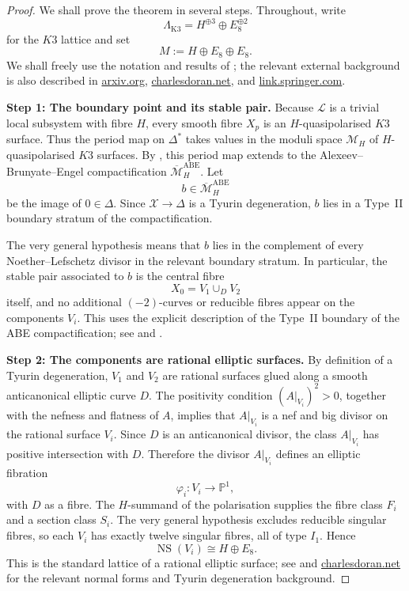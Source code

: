 \documentclass[11pt]{amsart}
\theoremstyle{plain}
\theoremstyle{remark}
\newcommand{\NS}{\operatorname{NS}}
\newcommand{\Kthree}{\mathrm{K3}}
\newcommand{\cL}{\mathcal{L}}
\newcommand{\cX}{\mathcal{X}}
\newcommand{\cM}{\mathcal{M}}
\newcommand{\bbP}{\mathbb{P}}
\newcommand{\Lk}{\Lambda_{\Kthree}}
\begin{document}
\begin{proof}
We shall prove the theorem in several steps. Throughout, write
\[
\Lk=H^{\oplus 3}\oplus E_8^{\oplus 2}
\]
for the \(K3\) lattice and set
\[
M:=H\oplus E_8\oplus E_8.
\]
We shall freely use the notation and results of \cite{dfk3slpms}; the relevant
external background is also described in
\href{https://arxiv.org/html/2405.12009}{arxiv.org},
\href{https://www.charlesdoran.net/uploads/6/7/5/1/6751141/2311.10394.pdf}{charlesdoran.net},
and
\href{https://link.springer.com/article/10.1007/s00209-019-02279-9}{link.springer.com}.

\medskip
\noindent
\textbf{Step 1: The boundary point and its stable pair.}
Because \(\cL\) is a trivial local subsystem with fibre \(H\), every smooth fibre
\(X_p\) is an \(H\)-quasipolarised \(K3\) surface. Thus the period map on
\(\Delta^*\) takes values in the moduli space \(\cM_H\) of \(H\)-quasipolarised
\(K3\) surfaces. By \cite[Theorem~1.1]{cmek3sspt}, this period map extends to the
Alexeev--Brunyate--Engel compactification \(\overline{\cM}_H^{\mathrm{ABE}}\).
Let
\[
b\in \overline{\cM}_H^{\mathrm{ABE}}
\]
be the image of \(0\in\Delta\). Since \(\cX\to\Delta\) is a Tyurin degeneration,
\(b\) lies in a Type~II boundary stratum of the compactification.

The very general hypothesis means that \(b\) lies in the complement of every
Noether--Lefschetz divisor in the relevant boundary stratum. In particular, the
stable pair associated to \(b\) is the central fibre
\[
X_0=V_1\cup_D V_2
\]
itself, and no additional \((-2)\)-curves or reducible fibres appear on the
components \(V_i\). This uses the explicit description of the Type~II boundary of
the ABE compactification; see \cite[Section~3]{dfk3slpms} and
\cite[Section~5]{cmek3sspt}.

\medskip
\noindent
\textbf{Step 2: The components are rational elliptic surfaces.}
By definition of a Tyurin degeneration, \(V_1\) and \(V_2\) are rational
surfaces glued along a smooth anticanonical elliptic curve \(D\). The positivity
condition \((A|_{V_i})^2>0\), together with the nefness and flatness of \(A\),
implies that \(A|_{V_i}\) is a nef and big divisor on the rational surface
\(V_i\). Since \(D\) is an anticanonical divisor, the class \(A|_{V_i}\) has
positive intersection with \(D\). Therefore the divisor \(A|_{V_i}\) defines an
elliptic fibration
\[
\varphi_i\colon V_i\longrightarrow \bbP^1,
\]
with \(D\) as a fibre. The \(H\)-summand of the polarisation supplies the fibre
class \(F_i\) and a section class \(S_i\). The very general hypothesis excludes
reducible singular fibres, so each \(V_i\) has exactly twelve singular fibres,
all of type \(I_1\). Hence
\[
\NS(V_i)\cong H\oplus E_8.
\]
This is the standard lattice of a rational elliptic surface; see
\cite[Section~3]{dfk3slpms} and
\href{https://www.charlesdoran.net/uploads/6/7/5/1/6751141/2311.10394.pdf}{charlesdoran.net}
for the relevant normal forms and Tyurin degeneration background.


\end{proof}
\end{document}
